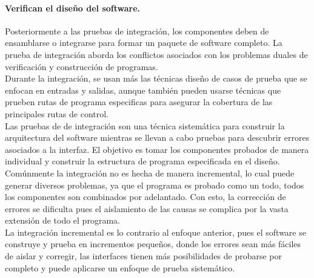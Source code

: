 \paragraph{Verifican el diseño del software.}
Posteriormente a las pruebas de integración, los componentes deben de ensamblarse o integrarse para formar un paquete de software completo. La prueba de integración aborda los conflictos asociados con los problemas duales de verificación y construcción de programas.\\ Durante la integración, se usan más las técnicas diseño de casos de prueba que se enfocan en entradas y salidas, aunque también pueden usarse técnicas que prueben rutas de programa especificas para asegurar la cobertura de las principales rutas de control.\\ Las pruebas de de integración son una técnica sistemática para construir la arquitectura del software mientras se llevan a cabo pruebas para descubrir errores asociados a la interfaz. El objetivo es tomar los componentes probados de manera individual y construir la estructura de programa especificada en el diseño.\\ Comúnmente la integración no es hecha de manera incremental, lo cual puede generar diversos problemas, ya que el programa es probado como un todo, todos los componentes son combinados por adelantado. Con esto, la corrección de errores se dificulta pues el aislamiento de las causas se complica por la vasta extensión de todo el programa.\\
La integración incremental es lo contrario al enfoque anterior, pues el software se construye y prueba en incrementos pequeños, donde los errores sean más fáciles de aislar y corregir, las interfaces tienen más posibilidades de probarse por completo y puede aplicarse un enfoque de prueba sistemático.
